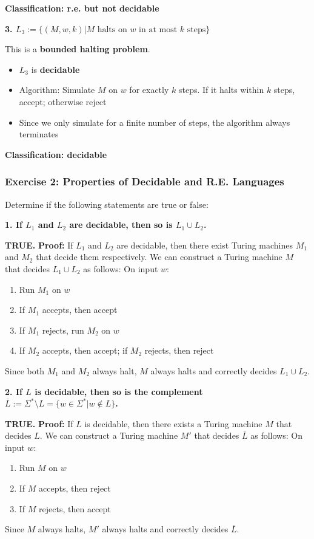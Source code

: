\documentclass{article}
\begin{document}
\textbf{Classification: r.e. but not decidable}

\textbf{3. $L_3 := \{(M,w,k) | M \text{ halts on } w \text{ in at most } k \text{ steps}\}$}

This is a \textbf{bounded halting problem}.
\begin{itemize}
\item $L_3$ is \textbf{decidable}
\item Algorithm: Simulate $M$ on $w$ for exactly $k$ steps. If it halts within $k$ steps, accept; otherwise reject
\item Since we only simulate for a finite number of steps, the algorithm always terminates
\end{itemize}

\textbf{Classification: decidable}

\subsubsection{Exercise 2: Properties of Decidable and R.E. Languages}

Determine if the following statements are true or false:

\textbf{1. If $L_1$ and $L_2$ are decidable, then so is $L_1 \cup L_2$.}

\textbf{TRUE.} 
\textbf{Proof:} If $L_1$ and $L_2$ are decidable, then there exist Turing machines $M_1$ and $M_2$ that decide them respectively. We can construct a Turing machine $M$ that decides $L_1 \cup L_2$ as follows:
On input $w$:
\begin{enumerate}
\item Run $M_1$ on $w$
\item If $M_1$ accepts, then accept
\item If $M_1$ rejects, run $M_2$ on $w$
\item If $M_2$ accepts, then accept; if $M_2$ rejects, then reject
\end{enumerate}
Since both $M_1$ and $M_2$ always halt, $M$ always halts and correctly decides $L_1 \cup L_2$.

\textbf{2. If $L$ is decidable, then so is the complement $\overline{L} := \Sigma^* \setminus L = \{w \in \Sigma^* | w \notin L\}$.}

\textbf{TRUE.}
\textbf{Proof:} If $L$ is decidable, then there exists a Turing machine $M$ that decides $L$. We can construct a Turing machine $M'$ that decides $\overline{L}$ as follows:
On input $w$:
\begin{enumerate}
\item Run $M$ on $w$
\item If $M$ accepts, then reject
\item If $M$ rejects, then accept
\end{enumerate}
Since $M$ always halts, $M'$ always halts and correctly decides $\overline{L}$.
\end{document}
